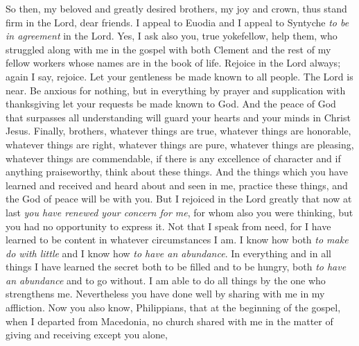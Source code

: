 \begin{biblechapter} %
 So then, my beloved and greatly desired brothers, my joy and crown, thus stand firm in the Lord, dear friends.
\verse I appeal to Euodia and I appeal to Syntyche \textit{to be in agreement} in the Lord.
\verse Yes, I ask also you, true yokefellow, help them, who struggled along with me in the gospel with both Clement and the rest of my fellow workers whose names are in the book of life.
 Rejoice in the Lord always; again I say, rejoice.
\verse Let your gentleness be made known to all people. The Lord is near.
\verse Be anxious for nothing, but in everything by prayer and supplication with thanksgiving let your requests be made known to God.
\verse And the peace of God that surpasses all understanding will guard your hearts and your minds in Christ Jesus.
\verse Finally, brothers, whatever things are true, whatever things are honorable, whatever things are right, whatever things are pure, whatever things are pleasing, whatever things are commendable, if there is any excellence of character and if anything praiseworthy, think about these things.
\verse And the things which you have learned and received and heard about and seen in me, practice these things, and the God of peace will be with you.
 But I rejoiced in the Lord greatly that now at last \textit{you have renewed your concern for me}, for whom also you were thinking, but you had no opportunity to express it.
\verse Not that I speak from need, for I have learned to be content in whatever circumstances I am.
\verse I know how both \textit{to make do with little} and I know how \textit{to have an abundance}. In everything and in all things I have learned the secret both to be filled and to be hungry, both \textit{to have an abundance} and to go without.
\verse I am able to do all things by the one who strengthens me.
\verse Nevertheless you have done well by sharing with me in my affliction.
\verse Now you also know, Philippians, that at the beginning of the gospel, when I departed from Macedonia, no church shared with me in the matter of giving and receiving except you alone,

\end{biblechapter}
